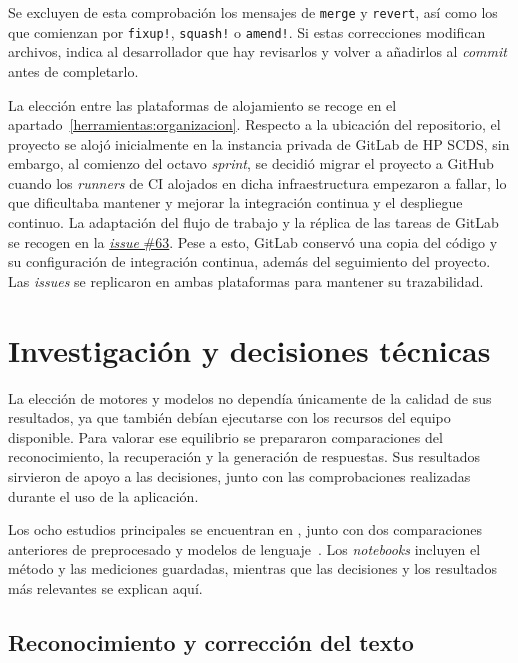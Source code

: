 Se excluyen de esta comprobación los mensajes de \texttt{merge} y
\texttt{revert}, así como los que comienzan por \texttt{fixup!},
\texttt{squash!} o \texttt{amend!}.
Si estas correcciones modifican archivos, indica al desarrollador que hay revisarlos y volver a añadirlos al \textit{commit}
antes de completarlo.

La elección entre las plataformas de alojamiento se recoge en el
apartado~\ref{herramientas:organizacion}.
Respecto a la ubicación del repositorio, el proyecto se alojó inicialmente en la instancia privada de GitLab
de HP SCDS, sin embargo, al comienzo del octavo \textit{sprint}, se decidió migrar
el proyecto a GitHub cuando los \textit{runners} de \ac{CI} alojados en dicha
infraestructura empezaron a fallar, lo que dificultaba mantener y mejorar
la integración continua y el despliegue continuo. La adaptación del flujo de
trabajo y la réplica
de las tareas de GitLab se recogen en la
\href{https://github.com/ibaimoya/manualito/issues/63}{\textit{issue} \#63}.
Pese a esto, GitLab conservó una copia del código y su configuración de
integración continua, además del seguimiento del proyecto. Las \textit{issues}
se replicaron en ambas plataformas para mantener su trazabilidad.

\section{Investigación y decisiones técnicas}
\label{aspectos:investigacion}

La elección de motores y modelos no dependía únicamente de la calidad de
sus resultados, ya que también debían ejecutarse con los recursos del equipo
disponible. Para valorar ese equilibrio se prepararon comparaciones del
reconocimiento, la recuperación y la generación de respuestas. Sus resultados
sirvieron de apoyo a las decisiones, junto con las comprobaciones realizadas
durante el uso de la aplicación.

Los ocho estudios principales se encuentran en
, junto con dos comparaciones anteriores de
preprocesado y modelos de lenguaje~\cite{manualito_benchmarks}.
Los \textit{notebooks} incluyen el método y las mediciones guardadas, mientras
que las decisiones y los resultados más relevantes se explican aquí.

\subsection{Reconocimiento y corrección del texto}

